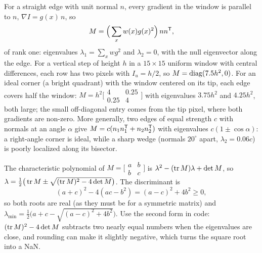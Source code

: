 \begin{solutions}
  \item For a straight edge with unit normal $n$, every gradient in the window is parallel to $n$, $\nabla I = g(x)\,n$, so
        \[
          M = \Big(\sum_xw(x)g(x)^2\Big)\,nn^{\mathsf{T}},
        \]
        of rank one: eigenvalues $\lambda_1 = \sum_xwg^2$ and $\lambda_2 = 0$, with the null eigenvector along the edge. For a vertical step of height $h$ in a $15\times15$ uniform window with
        central differences, each row has two pixels with $I_u = h/2$, so $M = \operatorname{diag}(7.5h^2, 0)$. For an ideal corner (a bright quadrant) with the window centered on
        its tip, each edge covers half the window: $M = h^2\big[\begin{smallmatrix} 4 & 0.25 \\ 0.25 & 4\end{smallmatrix}\big]$ with eigenvalues $3.75h^2$ and $4.25h^2$, both large; the small
        off-diagonal entry comes from the tip pixel, where both gradients are non-zero. More generally, two edges of equal strength $c$ with normals at an
        angle $\alpha$ give $M = c(n_1n_1^{\mathsf{T}} + n_2n_2^{\mathsf{T}})$ with eigenvalues $c(1 \pm \cos\alpha)$: a right-angle corner is ideal, while a sharp wedge (normals $20^\circ$ apart,
        $\lambda_2 = 0.06c$) is poorly localized along its bisector.

  \item The characteristic polynomial of $M = \big[\begin{smallmatrix} a & b \\ b & c\end{smallmatrix}\big]$ is $\lambda^2 - (\operatorname{tr} M)\lambda + \det M$, so $\lambda = \tfrac12\big(\operatorname{tr} M \pm \sqrt{(\operatorname{tr} M)^2 - 4\det M}\big)$.
        The discriminant is
        \[
          (a + c)^2 - 4(ac - b^2) = (a - c)^2 + 4b^2 \ge 0,
        \]
        so both roots are real (as they must be for a symmetric matrix) and
        $\lambda_{\min} = \tfrac12\big(a + c - \sqrt{(a - c)^2 + 4b^2}\big)$. Use the second form in code: $(\operatorname{tr} M)^2 - 4\det M$ subtracts two nearly equal numbers when the eigenvalues
        are close, and rounding can make it slightly negative, which turns the square root into a NaN.


\end{solutions}
